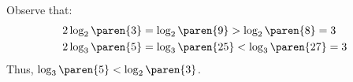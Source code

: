 Observe that:
\begin{equation*}
\begin{split}
 2 \log_2\paren{3} &= \log_2\paren{9}  > \log_2\paren{8}  = 3 \\
 2 \log_3\paren{5} &= \log_3\paren{25} < \log_3\paren{27} = 3
\end{split}
\end{equation*}
Thus, $\log_3\paren{5} < \log_2\paren{3}$.

